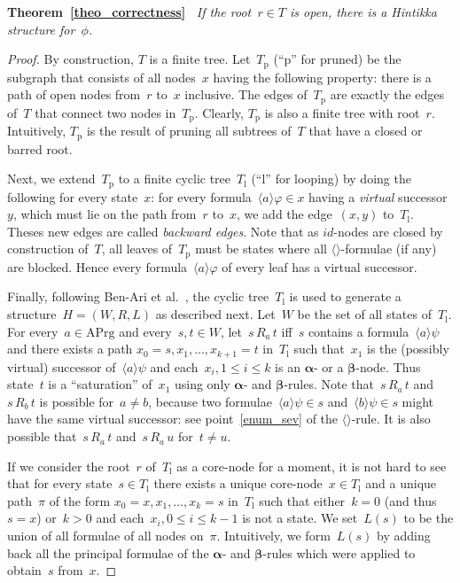 \documentclass{entcs}
\newcommand{\pea}[2]{\langle#1\rangle #2}
\newcommand{\act}{\mathrm{APrg}}
\newcommand{\fea}{$\pea{}{}$}
\newcommand{\prel}[3]{#1 \,#2\, #3}
\newcommand{\talpha}{\boldsymbol{\alpha}}
\newcommand{\tbeta}{\boldsymbol{\beta}}
\newcommand{\trid}{$id$}
\newcommand{\trea}{$\langle\rangle$}
\newcommand{\tm}{T_{\mathrm{p}}}
\newcommand{\tl}{T_{\mathrm{l}}}
\begin{document}
\noindent{}\textbf{Theorem~\ref{theo_correctness}\ }
\emph{If the root~$r \in T$ is open, there is a Hintikka structure for~$\phi$.}
\begin{proof}
  By construction, $T$ is a finite tree.
  Let~$\tm$ (``p'' for pruned)
  be the subgraph that consists of all nodes~$x$ having the following property:
  there is a path of open nodes from~$r$ to~$x$ inclusive.
  The edges of~$\tm$ are exactly the edges of~$T$ that connect two nodes in~$\tm$.
  Clearly, $\tm$ is also a finite tree with root~$r$.
  Intuitively, $\tm$ is the result of pruning all subtrees of~$T$ that have a closed or barred root.

  Next, we extend~$\tm$ to a finite cyclic tree~$\tl$ (``l'' for looping)
  by doing the following for every state~$x$:
  for every formula~$\pea{a}{\varphi} \in x$ having a \emph{virtual} successor~$y$,
  which must lie on the path from~$r$ to~$x$,
  we add the edge~$(x, y)$ to~$\tl$.
  Theses new edges are called \emph{backward edges}.
  Note that as \trid{}-nodes are closed by construction of~$T$,
  all leaves of~$\tm$ must be states where all \fea{}-formulae (if any) are blocked.
  Hence every formula~$\pea{a}{\varphi}$ of every leaf has a virtual successor.

  Finally, following Ben-Ari et al.~\cite{ben-ari-pnueli-manna-branching},
  the cyclic tree~$\tl$ is used to generate a structure~$H = (W,R,L)$
  as described next.
  Let~$W$ be the set of all states of~$\tl$.
  For every~$a \in \act$ and every~$s, t \in W$,
  let~$\prel{s}{R_a}{t}$ iff~$s$ contains a formula~$\pea{a}{\psi}$
  and there exists a path $x_0 = s, x_1, \dotsc, x_{k+1} = t$ in~$\tl$
  such that~$x_1$ is the (possibly virtual) successor of~$\pea{a}{\psi}$
  and each~$x_i, 1 \leq i \leq k$ is an $\talpha$- or a $\tbeta$-node.
  Thus state~$t$ is a ``saturation'' of~$x_1$ using only $\talpha$- and $\tbeta$-rules.
  Note that~$\prel{s}{R_a}{t}$ and~$\prel{s}{R_b}{t}$ is possible for~$a \not= b$,
  because two formulae~$\pea{a}{\psi} \in s$ and~$\pea{b}{\psi} \in s$ might have the same virtual successor:
  see point~\ref{enum_sev} of the \trea{}-rule.
  It is also possible that~$\prel{s}{R_a}{t}$ and~$\prel{s}{R_a}{u}$ for~$t \not= u$.

  If we consider the root~$r$ of~$\tl$ as a core-node for a moment,
  it is not hard to see that for every state~$s \in \tl$
  there exists a unique core-node~$x \in \tl$
  and a unique path~$\pi$ of the form $x_0 = x, x_1, \dotsc, x_k = s$ in~$\tl$
  such that either~$k = 0$ (and thus~$s = x$)
  or~$k > 0$ and each~$x_i, 0 \leq i \leq k-1$ is not a state.
  We set~$L(s)$ to be the union of all formulae of all nodes on~$\pi$.
  Intuitively, we form~$L(s)$ by adding back all the principal formulae
  of the $\talpha$- and $\tbeta$-rules
  which were applied to obtain~$s$ from~$x$.


\end{proof}
\end{document}
